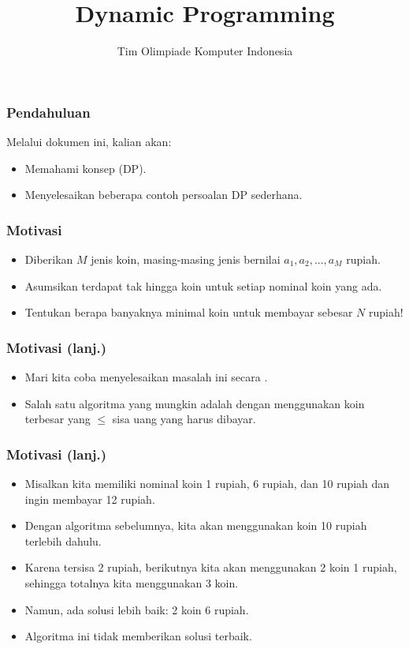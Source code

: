 

\title{Dynamic Programming}
\author{Tim Olimpiade Komputer Indonesia}
\date{}

\usepackage{qtree}


\begin{frame}
\titlepage
\end{frame}

\begin{frame}
\frametitle{Pendahuluan}
Melalui dokumen ini, kalian akan:
\begin{itemize}
  \item Memahami konsep  (DP).
  \item Menyelesaikan beberapa contoh persoalan DP sederhana.
\end{itemize}
\end{frame}

\begin{frame}
\frametitle{Motivasi}
\begin{itemize}
  \item Diberikan $M$ jenis koin, masing-masing jenis bernilai $a_1, a_2, ..., a_M$ rupiah.
  \item Asumsikan terdapat tak hingga koin untuk setiap nominal koin yang ada. 
  \item Tentukan berapa banyaknya minimal koin untuk membayar sebesar $N$ rupiah!
\end{itemize}
\end{frame}

\begin{frame}
\frametitle{Motivasi (lanj.)}
\begin{itemize}
  \item Mari kita coba menyelesaikan masalah ini secara \fGreedy.
  \item Salah satu algoritma \fGreedy yang mungkin adalah dengan menggunakan koin terbesar yang $\leq$ sisa uang yang harus dibayar.
\end{itemize}
\end{frame}

\begin{frame}
\frametitle{Motivasi (lanj.)}
\begin{itemize}
  \item Misalkan kita memiliki nominal koin 1 rupiah, 6 rupiah, dan 10 rupiah dan ingin membayar 12 rupiah.
  \item Dengan algoritma sebelumnya, kita akan menggunakan koin 10 rupiah terlebih dahulu. 
  \item Karena tersisa 2 rupiah, berikutnya kita akan menggunakan 2 koin 1 rupiah, sehingga totalnya kita menggunakan 3 koin.
  \item Namun, ada solusi lebih baik: 2 koin 6 rupiah.
  \item Algoritma \fGreedy ini tidak memberikan solusi terbaik.
\end{itemize}
\end{frame}

